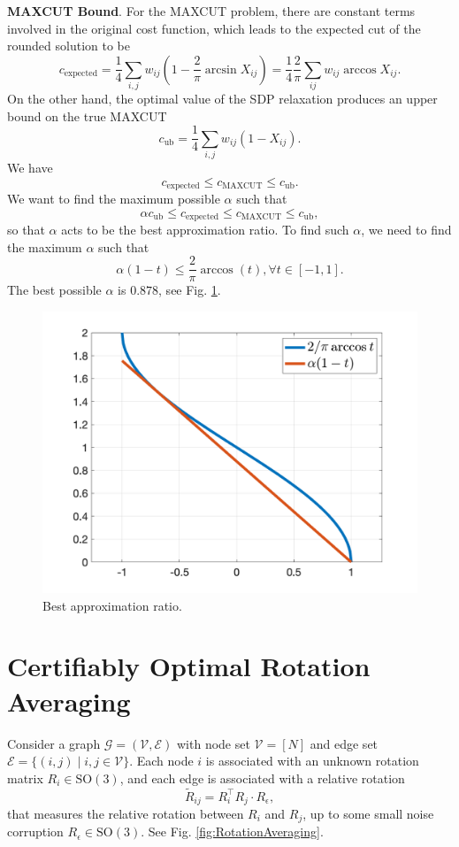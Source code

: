 \documentclass[
]{book}
\theoremstyle{definition}
\theoremstyle{definition}
\theoremstyle{definition}
\theoremstyle{definition}
\theoremstyle{remark}
\begin{document}
\textbf{MAXCUT Bound}. For the MAXCUT problem, there are constant terms involved in the original cost function, which leads to the expected cut of the rounded solution to be
\[
c_{\mathrm{expected}} = \frac{1}{4} \sum_{i,j} w_{ij} \left( 1- \frac{2}{\pi} \arcsin X_{ij} \right) = \frac{1}{4} \frac{2}{\pi} \sum_{ij} w_{ij} \arccos X_{ij}.
\]
On the other hand, the optimal value of the SDP relaxation produces an upper bound on the true MAXCUT
\[
c_{\mathrm{ub}} = \frac{1}{4} \sum_{i,j} w_{ij} (1 - X_{ij}).
\]
We have
\[
c_{\mathrm{expected}} \leq c_{\mathrm{MAXCUT}} \leq c_{\mathrm{ub}}.
\]
We want to find the maximum possible \(\alpha\) such that
\[
\alpha c_{\mathrm{ub}} \leq c_{\mathrm{expected}} \leq c_{\mathrm{MAXCUT}} \leq c_{\mathrm{ub}},
\]
so that \(\alpha\) acts to be the best approximation ratio. To find such \(\alpha\), we need to find the maximum \(\alpha\) such that
\[
\alpha (1 - t) \leq \frac{2}{\pi} \arccos(t), \forall t \in [-1,1].
\]
The best possible \(\alpha\) is \(0.878\), see Fig. \ref{fig:MAXCUTAlpha}.

\begin{figure}

{\centering \includegraphics[width=0.6\linewidth]{images/maxcut_alpha} 

}

\caption{Best approximation ratio.}\label{fig:MAXCUTAlpha}
\end{figure}

\section{Certifiably Optimal Rotation Averaging}\label{certifiably-optimal-rotation-averaging}

Consider a graph \(\mathcal{G}= (\mathcal{V},\mathcal{E})\) with node set \(\mathcal{V}= [N]\) and edge set \(\mathcal{E}= \{(i,j) \mid i,j \in \mathcal{V}\}\). Each node \(i\) is associated with an unknown rotation matrix \(R_i \in \mathrm{SO}(3)\), and each edge is associated with a relative rotation
\begin{equation}
\tilde{R}_{ij} = R_i^\top R_j \cdot R_{\epsilon},
\label{eq:rotation-averaging-gen-model}
\end{equation}
that measures the relative rotation between \(R_i\) and \(R_j\), up to some small noise corruption \(R_{\epsilon} \in \mathrm{SO}(3)\). See Fig. \ref{fig:RotationAveraging}.
\end{document}
